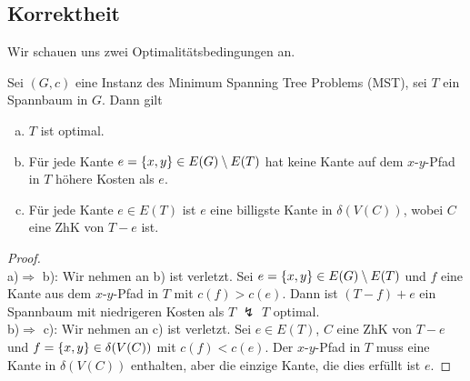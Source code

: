 \subsection*{Korrektheit}
Wir schauen uns zwei Optimalitätsbedingungen an.	
\begin{satz}
	Sei $(G,c)$ eine Instanz des Minimum Spanning Tree Problems (MST), sei $T$ ein Spannbaum in $G$. Dann gilt
	\begin{enumerate}[a)]
		\item $T$ ist optimal.
		\item Für jede Kante $e=\{x,y\} \in E(G)\setminus E(T)$ hat keine Kante auf dem $x$-$y$-Pfad in $T$ höhere Kosten als $e$.
		\item Für jede Kante $e\in E(T)$ ist $e$ eine billigste Kante in $\delta(V(C))$, wobei $C$ eine ZhK von $T-e$ ist.
	\end{enumerate}
\end{satz}
\begin{proof}~\\
	a)$\Rightarrow$ b): Wir nehmen an b) ist verletzt. Sei $e=\{x,y\} \in E(G)\setminus E(T)$ und $f$ eine Kante aus dem $x$-$y$-Pfad in $T$ mit $c(f) > c(e)$. Dann ist $(T-f)+e$ ein Spannbaum mit niedrigeren Kosten als $T$ $\lightning$ $T$ optimal.\\
	b)$\Rightarrow$ c): Wir nehmen an c) ist verletzt. Sei $e\in E(T)$, $C$ eine ZhK von $T-e$ und $f=\{x,y\} \in \delta(V(C))$ mit $c(f) < c(e)$. Der $x$-$y$-Pfad in $T$ muss eine Kante in $\delta(V(C))$ enthalten, aber die einzige Kante, die dies erfüllt ist $e$.
\end{proof}
	
	